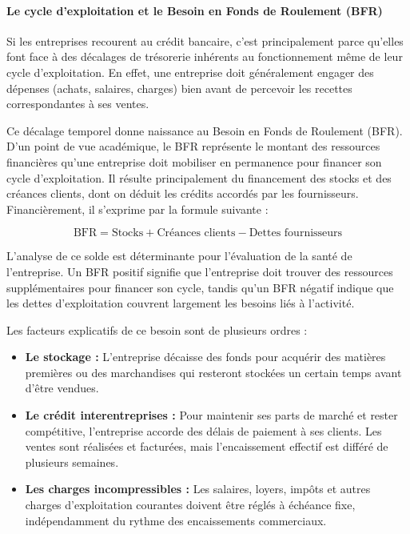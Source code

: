 \paragraph{Le cycle d'exploitation et le Besoin en Fonds de Roulement (BFR)}

Si les entreprises recourent au crédit bancaire, c'est principalement parce qu'elles font face à des décalages de trésorerie inhérents au fonctionnement même de leur cycle d'exploitation. En effet, une entreprise doit généralement engager des dépenses (achats, salaires, charges) bien avant de percevoir les recettes correspondantes à ses ventes.

Ce décalage temporel donne naissance au Besoin en Fonds de Roulement (BFR). D'un point de vue académique, le BFR représente le montant des ressources financières qu'une entreprise doit mobiliser en permanence pour financer son cycle d'exploitation. Il résulte principalement du financement des stocks et des créances clients, dont on déduit les crédits accordés par les fournisseurs. Financièrement, il s'exprime par la formule suivante :

\begin{equation}
  \text{BFR} = \text{Stocks} + \text{Créances clients} - \text{Dettes fournisseurs}
\end{equation}

L'analyse de ce solde est déterminante pour l'évaluation de la santé de l'entreprise. Un BFR positif signifie que l'entreprise doit trouver des ressources supplémentaires pour financer son cycle, tandis qu'un BFR négatif indique que les dettes d'exploitation couvrent largement les besoins liés à l'activité.

Les facteurs explicatifs de ce besoin sont de plusieurs ordres :

\begin{itemize}
  \item \textbf{Le stockage :} L'entreprise décaisse des fonds pour acquérir des matières premières ou des marchandises qui resteront stockées un certain temps avant d'être vendues.
  \item \textbf{Le crédit interentreprises :} Pour maintenir ses parts de marché et rester compétitive, l'entreprise accorde des délais de paiement à ses clients. Les ventes sont réalisées et facturées, mais l'encaissement effectif est différé de plusieurs semaines.
  \item \textbf{Les charges incompressibles :} Les salaires, loyers, impôts et autres charges d'exploitation courantes doivent être réglés à échéance fixe, indépendamment du rythme des encaissements commerciaux.
\end{itemize}

